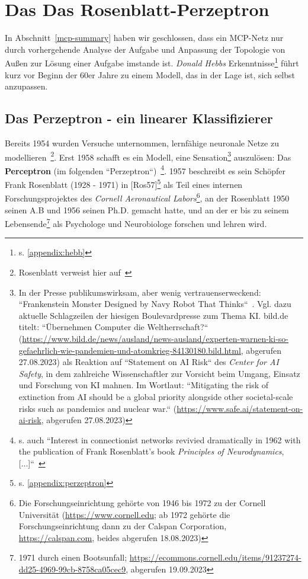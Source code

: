 \section{Das Das Rosenblatt-Perzeptron}

In Abschnitt~\ref{mcp-summary} haben wir geschlossen, dass ein MCP-Netz nur durch vorhergehende Analyse der Aufgabe und Anpassung der Topologie von Außen zur Lösung einer Aufgabe imstande ist.
\textit{Donald Hebbs} Erkenntnisse\footnote{
    s. \ref{appendix:hebb}
} führt kurz vor Beginn der 60er Jahre zu einem Modell, das in der Lage ist, sich selbst anzupassen.


\subsection{Das Perzeptron - ein linearer Klassifizierer}

Bereits 1954 wurden Versuche unternommen, lernfähige neuronale Netze zu modellieren~\cite[24]{Ros62}\footnote{
    Rosenblatt verweist hier auf~\cite{FC54}
}.
Erst 1958 schafft es ein Modell, eine Sensation\footnote{
    In der Presse publikumswirksam, aber wenig vertrauenserweckend: ``Frankenstein Monster Designed by Navy Robot That Thinks``~\cite[v]{Ros62}. Vgl. dazu aktuelle Schlagzeilen der hiesigen Boulevardpresse zum Thema KI. bild.de titelt: ``Übernehmen Computer die Weltherrschaft?`` (\url{https://www.bild.de/news/ausland/news-ausland/experten-warnen-ki-so-gefaehrlich-wie-pandemien-und-atomkrieg-84130180.bild.html}, abgerufen 27.08.2023) als Reaktion auf ``Statement on AI Risk`` des \textit{Center for AI Safety}, in dem zahlreiche Wissenschaftler zur Vorsicht beim Umgang, Einsatz und Forschung von KI mahnen. Im Wortlaut: ``Mitigating the risk of extinction from AI should be a global priority alongside other societal-scale risks such as pandemics and nuclear war.`` (\url{https://www.safe.ai/statement-on-ai-risk}, abgerufen 27.08.2023)
} auszulösen: Das \textbf{Perceptron} (im folgenden ``Perzeptron``)~\cite[89]{AR88}\footnote{
    s. auch ``Interest in connectionist networks revivied dramatically in 1962 with the publication of Frank Rosenblatt's book \textit{Principles of Neurodynamics}, [...]``~\cite[xi, Hervorhebung i.O.]{MP88}
}.
1957 beschreibt es sein Schöpfer Frank Rosenblatt (1928 - 1971) in [Ros57]\footnote{
    s. \ref{appendix:perzeptron}
} als Teil eines internen Forschungsprojektes des \textit{Cornell Aeronautical Labors}\footnote{
    Die Forschungseinrichtung gehörte von 1946 bis 1972 zu der Cornell Universität (\url{https://www.cornell.edu}; ab 1972 gehörte die Forschungseinrichtung dann zu der Calspan Corporation, \url{https://calspan.com}, beides abgerufen 18.08.2023)
}, an der Rosenblatt 1950 seinen A.B und 1956 seinen Ph.D. gemacht hatte, und an der er bis zu seinem Lebensende\footnote{
    1971 durch einen Bootsunfall; \url{https://ecommons.cornell.edu/items/91237274-dd25-4969-99cb-8758ca05cec9}, abgerufen 19.09.2023
} als Psychologe und Neurobiologe forschen und lehren wird.


